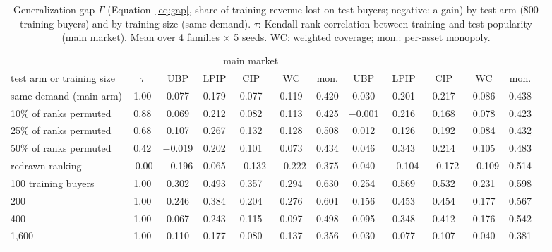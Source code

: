 
\begin{table}[t]
  \centering
  \small
  \caption{Generalization gap $\Gamma$ (Equation~\eqref{eq:gap}, share of training revenue lost on test buyers; negative: a gain) by test arm (800 training buyers) and by training size (same demand). $\tau$: Kendall rank correlation between training and test popularity (main market). Mean over 4 families $\times$ 5 seeds. WC: \qirana{} weighted coverage; mon.: per-asset monopoly.}
  \label{tab:arms}
  \begin{tabular}{@{}lcccccccccccc@{}}
    \toprule
    & & \multicolumn{5}{c}{\sqlshare{} main market} & \multicolumn{5}{c}{\tpch{}} \\
    \cmidrule(lr){3-7}\cmidrule(lr){8-12}
    test arm or training size & $\tau$ & UBP & LPIP & CIP & WC & mon. & UBP & LPIP & CIP & WC & mon. \\
    \midrule
    same demand (main arm) & 1.00 & 0.077 & 0.179 & 0.077 & 0.119 & 0.420 & 0.030 & 0.201 & 0.217 & 0.086 & 0.438 \\
    10\% of ranks permuted & 0.88 & 0.069 & 0.212 & 0.082 & 0.113 & 0.425 & $-$0.001 & 0.216 & 0.168 & 0.078 & 0.423 \\
    25\% of ranks permuted & 0.68 & 0.107 & 0.267 & 0.132 & 0.128 & 0.508 & 0.012 & 0.126 & 0.192 & 0.084 & 0.432 \\
    50\% of ranks permuted & 0.42 & $-$0.019 & 0.202 & 0.101 & 0.073 & 0.434 & 0.046 & 0.343 & 0.214 & 0.105 & 0.483 \\
    redrawn ranking & -0.00 & $-$0.196 & 0.065 & $-$0.132 & $-$0.222 & 0.375 & 0.040 & $-$0.104 & $-$0.172 & $-$0.109 & 0.514 \\
    \midrule
    100 training buyers & 1.00 & 0.302 & 0.493 & 0.357 & 0.294 & 0.630 & 0.254 & 0.569 & 0.532 & 0.231 & 0.598 \\
    200 & 1.00 & 0.246 & 0.384 & 0.204 & 0.276 & 0.601 & 0.156 & 0.453 & 0.454 & 0.177 & 0.567 \\
    400 & 1.00 & 0.067 & 0.243 & 0.115 & 0.097 & 0.498 & 0.095 & 0.348 & 0.412 & 0.176 & 0.542 \\
    1,600 & 1.00 & 0.110 & 0.177 & 0.080 & 0.137 & 0.356 & 0.030 & 0.077 & 0.107 & 0.040 & 0.381 \\
    \bottomrule
  \end{tabular}
\end{table}
